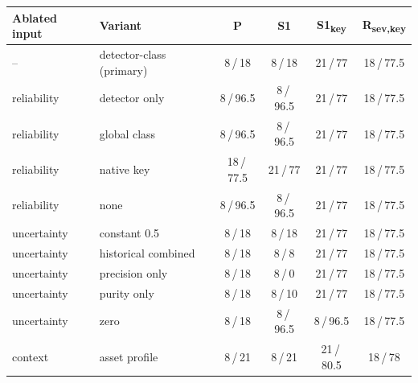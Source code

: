 \documentclass[pdflatex,sn-basic,Numbered]{sn-jnl}
\begin{document}
\begin{tableorg}[t]
\centering
\caption{Input ablations with full nested reselection: covered intervals at $k=100$ (of 32) / median FP@100.}
\label{tab:ablation}
\small
\begin{tabular}{llcccc}
\toprule
Ablated input & Variant & P & S1 & S1\textsubscript{key} & R\textsubscript{sev,key} \\
\midrule
-- & detector-class (primary) & 8\,/\,18 & 8\,/\,18 & 21\,/\,77 & 18\,/\,77.5 \\
reliability & detector only & 8\,/\,96.5 & 8\,/\,96.5 & 21\,/\,77 & 18\,/\,77.5 \\
reliability & global class & 8\,/\,96.5 & 8\,/\,96.5 & 21\,/\,77 & 18\,/\,77.5 \\
reliability & native key & 18\,/\,77.5 & 21\,/\,77 & 21\,/\,77 & 18\,/\,77.5 \\
reliability & none & 8\,/\,96.5 & 8\,/\,96.5 & 21\,/\,77 & 18\,/\,77.5 \\
uncertainty & constant 0.5 & 8\,/\,18 & 8\,/\,18 & 21\,/\,77 & 18\,/\,77.5 \\
uncertainty & historical combined & 8\,/\,18 & 8\,/\,8 & 21\,/\,77 & 18\,/\,77.5 \\
uncertainty & precision only & 8\,/\,18 & 8\,/\,0 & 21\,/\,77 & 18\,/\,77.5 \\
uncertainty & purity only & 8\,/\,18 & 8\,/\,10 & 21\,/\,77 & 18\,/\,77.5 \\
uncertainty & zero & 8\,/\,18 & 8\,/\,96.5 & 8\,/\,96.5 & 18\,/\,77.5 \\
context & asset profile & 8\,/\,21 & 8\,/\,21 & 21\,/\,80.5 & 18\,/\,78 \\
\bottomrule
\end{tabular}
\unskip
\end{tableorg}
\end{document}
